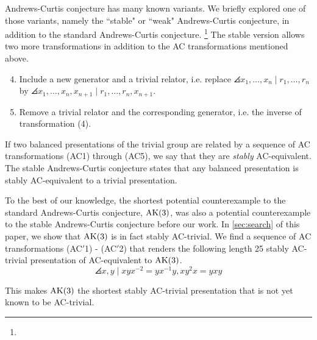 Andrews-Curtis conjecture has many known variants. We briefly explored one of those variants, namely the ``stable" or ``weak" Andrews-Curtis conjecture, in addition to the standard Andrews-Curtis conjecture. 
\footnote{}
The stable version allows two more transformations in addition to the AC transformations mentioned above. 

\begin{enumerate}[label=(AC\arabic*)]
	\setcounter{enumi}{3}
	\item Include a new generator and a trivial relator, i.e. replace $\angles{x_1, \dots, x_n \mid r_1, \dots, r_n}$ by $\angles{x_1, \dots, x_n, x_{n+1} \mid r_1, \dots, r_n, x_{n+1}}$.
	\item Remove a trivial relator and the corresponding generator, i.e. the inverse of transformation (4). 
\end{enumerate}

If two balanced presentations of the trivial group are related by a sequence of AC transformations (AC1) through (AC5), we say that they are \textit{stably} AC-equivalent. The stable Andrews-Curtis conjecture states that any balanced presentation is stably AC-equivalent to a trivial presentation. 
\newline 

To the best of our knowledge, the shortest potential counterexample to the standard Andrews-Curtis conjecture, $\text{AK}(3)$, was also a potential counterexample to the stable Andrews-Curtis conjecture before our work. In \autoref{sec:search} of this paper, we show that $\text{AK}(3)$ is in fact stably AC-trivial. We find a sequence of AC transformations (AC$'$1) - (AC$'$2) that renders the following length 25 stably AC-trivial presentation of \cite{MMS} AC-equivalent to $\text{AK}(3)$.
\[
\angles{x, y \mid x y x^{-2} = y x^{-1} y, xy^2 x = y x y}
\]

This makes $\text{AK}(3)$ the shortest stably AC-trivial presentation that is not yet known to be AC-trivial.
 
